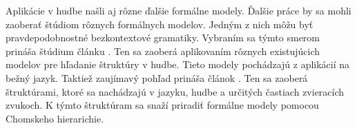 Aplikácie v hudbe našli aj rôzne ďalšie formálne modely. Ďalšie práce by sa mohli zaoberať štúdiom rôznych formálnych modelov. Jedným z nich môžu byť pravdepodobnostné bezkontextové gramatiky. Vybraním sa týmto smerom prináša štúdium článku \cite{gil:2022:Citace}. Ten sa zaoberá aplikovaním rôznych existujúcich modelov pre hľadanie štruktúry v hudbe. Tieto modely pochádzajú z aplikácií na bežný jazyk.  
Taktiež zaujímavý pohľad prináša článok \cite{wilanimal:2022:Citace}. Ten sa zaoberá štruktúrami, ktoré sa nachádzajú v jazyku, hudbe a určitých častiach zvieracích zvukoch. K týmto štruktúram sa snaží priradiť formálne modely pomocou Chomskeho hierarichie.



